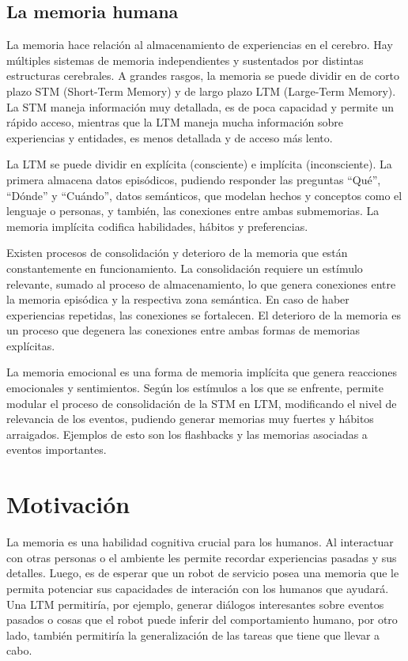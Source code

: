 \subsection{La memoria humana}

La memoria hace relaci\'on al almacenamiento de experiencias en el cerebro. Hay m\'ultiples sistemas de memoria independientes y sustentados por distintas estructuras cerebrales. A grandes rasgos, la memoria se puede dividir en de corto plazo STM (Short-Term Memory) y de largo plazo LTM (Large-Term Memory). La STM maneja informaci\'on muy detallada, es de poca capacidad y permite un r\'apido acceso, mientras que la LTM maneja mucha informaci\'on sobre experiencias y entidades, es menos detallada y de acceso m\'as lento\cite{Eichenbaum:2008}.

La LTM se puede dividir en expl\'icita (consciente) e impl\'icita (inconsciente). La primera almacena datos epis\'odicos, pudiendo responder las preguntas ``Qu\'e'', ``D\'onde'' y ``Cu\'ando'', datos sem\'anticos, que modelan hechos y conceptos como el lenguaje o personas, y tambi\'en, las conexiones entre ambas submemorias. La memoria impl\'icita codifica habilidades, h\'abitos y preferencias.

Existen procesos de consolidaci\'on y deterioro de la memoria que est\'an constantemente en funcionamiento. La consolidaci\'on requiere un est\'imulo relevante, sumado al proceso de almacenamiento, lo que genera conexiones entre la memoria epis\'odica y la respectiva zona sem\'antica. En caso de haber experiencias repetidas, las conexiones se fortalecen. El deterioro de la memoria es un proceso que degenera las conexiones entre ambas formas de memorias expl\'icitas.

La memoria emocional es una forma de memoria impl\'icita que genera reacciones emocionales y sentimientos. Seg\'un los est\'imulos a los que se enfrente, permite modular el proceso de consolidaci\'on de la STM en LTM, modificando el nivel de relevancia de los eventos, pudiendo generar memorias muy fuertes y h\'abitos arraigados. Ejemplos de esto son los flashbacks y las memorias asociadas a eventos importantes.



\section{Motivaci\'on}

La memoria es una habilidad cognitiva crucial para los humanos. Al interactuar con otras personas o el ambiente les permite recordar experiencias pasadas y sus detalles. Luego, es de esperar que un robot de servicio posea una memoria que le permita potenciar sus capacidades de interaci\'on con los humanos que ayudar\'a\cite{Vijayakumar2014}. Una LTM permitir\'ia, por ejemplo, generar di\'alogos interesantes sobre eventos pasados o cosas que el robot puede inferir del comportamiento humano, por otro lado, tambi\'en permitir\'ia la generalizaci\'on de las tareas que tiene que llevar a cabo.

